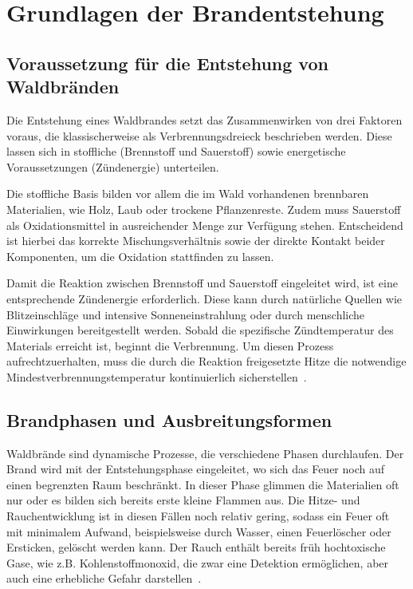 
\chapter{Grundlagen der Brandentstehung}\label{ch:grundlagenBrandentstehung}
\section{Voraussetzung für die Entstehung von Waldbränden}
Die Entstehung eines Waldbrandes setzt das Zusammenwirken von drei Faktoren voraus, die klassischerweise als Verbrennungsdreieck beschrieben werden. Diese lassen sich in stoffliche (Brennstoff und Sauerstoff) sowie energetische Voraussetzungen (Zündenergie) unterteilen.

Die stoffliche Basis bilden vor allem die im Wald vorhandenen brennbaren Materialien, wie Holz, Laub oder trockene Pflanzenreste. Zudem muss Sauerstoff als Oxidationsmittel in ausreichender Menge zur Verfügung stehen. Entscheidend ist hierbei das korrekte Mischungsverhältnis sowie der direkte Kontakt beider Komponenten, um die Oxidation stattfinden zu lassen.

Damit die Reaktion zwischen Brennstoff und Sauerstoff eingeleitet wird, ist eine entsprechende Zündenergie erforderlich. Diese kann durch natürliche Quellen wie Blitzeinschläge und intensive Sonneneinstrahlung oder durch menschliche Einwirkungen bereitgestellt werden. Sobald die spezifische Zündtemperatur des Materials erreicht ist, beginnt die Verbrennung. Um diesen Prozess aufrechtzuerhalten, muss die durch die Reaktion freigesetzte Hitze die notwendige Mindestverbrennungstemperatur kontinuierlich sicherstellen~\cite{HLFS2016, BIOEXGmbH}.


\section{Brandphasen und Ausbreitungsformen}
Waldbrände sind dynamische Prozesse, die verschiedene Phasen durchlaufen. Der Brand wird mit der Entstehungsphase eingeleitet, wo sich das Feuer noch auf einen begrenzten Raum beschränkt. In dieser Phase glimmen die Materialien oft nur oder es bilden sich bereits erste kleine Flammen aus. Die Hitze- und Rauchentwicklung ist in diesen Fällen noch relativ gering, sodass ein Feuer oft mit minimalem Aufwand, beispielsweise durch Wasser, einen Feuerlöscher oder Ersticken, gelöscht werden kann. Der Rauch enthält bereits früh hochtoxische Gase, wie z.B. Kohlenstoffmonoxid, die zwar eine Detektion ermöglichen, aber auch eine erhebliche Gefahr darstellen~\cite{TobisJakobs}.

